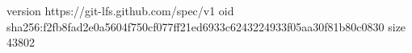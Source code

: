 version https://git-lfs.github.com/spec/v1
oid sha256:f2fb8fad2e0a5604f750cf077ff21ed6933c6243224933f05aa30f81b80c0830
size 43802
